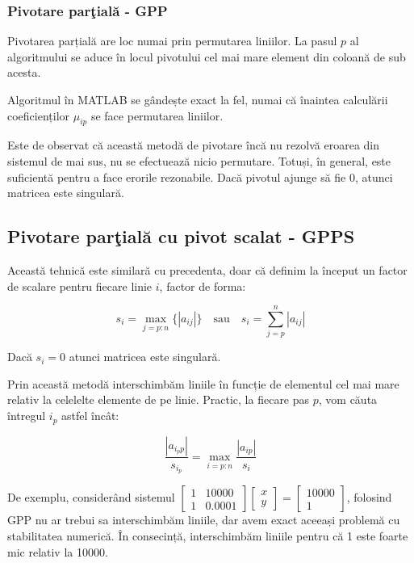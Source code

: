 \documentclass{exam}
\newcommand{\octavescript}[2]{
	
}
\begin{document}
\subsubsection{Pivotare parţială - GPP}

\par Pivotarea parțială are loc numai prin permutarea liniilor. La pasul $p$ al
algoritmului se aduce în locul pivotului cel mai mare element din coloană de sub
acesta.

\par Algoritmul în MATLAB se gândește exact la fel, numai că înaintea calculării
coeficienților $\mu_{ip}$ se face permutarea liniilor.

\octavescript{./src/GPP.m}{}

\par Este de observat că această metodă de pivotare încă nu rezolvă eroarea din
sistemul de mai sus, nu se efectuează nicio permutare. Totuși, în general, este
suficientă pentru a face erorile rezonabile. Dacă pivotul ajunge să fie 0,
atunci matricea este singulară.

\subsection{Pivotare parţială cu pivot scalat - GPPS}

\par Această tehnică este similară cu precedenta, doar că definim la început un
factor de scalare pentru fiecare linie $i$, factor de forma:

\begin{equation*}
	s_i = \max_{j=p:n}{\{|a_{ij}|\}} \quad \text{sau} \quad s_i = \sum_{j=p}^{n}{|a_{ij}|}
\end{equation*}

\par Dacă $s_i = 0$ atunci matricea este singulară.

\par Prin această metodă interschimbăm liniile în funcție de elementul cel mai
mare relativ la celelelte elemente de pe linie. Practic, la fiecare pas $p$,
vom căuta întregul $i_p$ astfel încât:

\begin{equation*}
	\frac{|a_{i_p p}|}{s_{i_p}} = \max_{i=p:n}{\frac{|a_{i p}|}{s_i}}
\end{equation*}

\par De exemplu, considerând sistemul
$\begin{bmatrix}
		1 & 10000  \\
		1 & 0.0001
	\end{bmatrix}
	\begin{bmatrix}
		x \\
		y
	\end{bmatrix}
	=
	\begin{bmatrix}
		10000 \\
		1
	\end{bmatrix}
$, folosind GPP nu ar trebui sa interschimbăm liniile, dar avem exact aceeași
problemă cu stabilitatea numerică. În consecință, interschimbăm liniile pentru
că 1 este foarte mic relativ la 10000.
\end{document}
